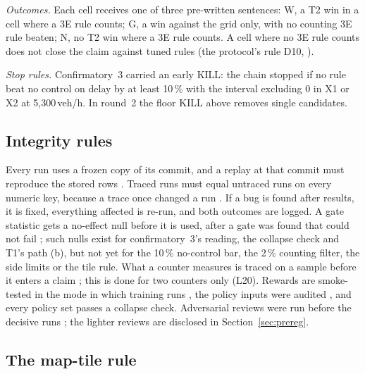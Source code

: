 \emph{Outcomes.} Each cell receives one of three pre-written sentences:
W, a T2 win in a cell where a 3E rule counts;
G, a win against the grid only, with no counting 3E rule beaten;
N, no T2 win where a 3E rule counts.
A cell where no 3E rule counts does not close the claim against tuned rules (the protocol's rule D10, ).

\emph{Stop rules.} Confirmatory~3 carried an early KILL: the chain stopped if no rule beat no control on delay by at least 10\,\% with the interval excluding 0 in X1 or X2 at 5,300\,veh/h. In round~2 the floor KILL above removes single candidates.

\begin{table}[tbp]
\centering
{}
\caption{Readings and thresholds fixed before data.}\label{tab:readings}
\end{table}

\subsection{Integrity rules}\label{sec:integrity}

Every run uses a frozen copy of its commit, and a replay at that commit must reproduce the stored rows .
Traced runs must equal untraced runs on every numeric key, because a trace once changed a run .
If a bug is found after results, it is fixed, everything affected is re-run, and both outcomes are logged.
A gate statistic gets a no-effect null before it is used, after a gate was found that could not fail ; such nulls exist for confirmatory~3's reading, the collapse check and T1's path (b), but not yet for the 10\,\% no-control bar, the 2\,\% counting filter, the side limits or the tile rule.
What a counter measures is traced on a sample before it enters a claim ; this is done for two counters only (L20).
Rewards are smoke-tested in the mode in which training runs , the policy inputs were audited , and every policy set passes a collapse check.
Adversarial reviews were run before the decisive runs ; the lighter reviews are disclosed in Section~\ref{sec:prereg}.

\subsection{The map-tile rule}\label{sec:tile_rule}

